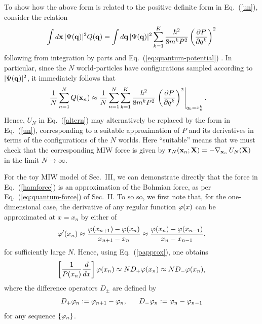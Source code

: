 \documentclass[twocolumn,aps,pra,amsmath,amssymb,superscriptaddress]{revtex4}
\renewcommand{\(}{\left(}
\renewcommand{\)}{\right)}
\newcommand{\blk}{\color{black}}
\begin{document}
{To show how the above form is related to the positive definite form in Eq.~(\ref{un}), consider the relation
\[ \int d{\bf x} \,|\Psi({\bf q})|^2 Q({\bf q}) = \int d{\bf q}\, |\Psi({\bf q})|^2 \sum_{k=1}^K\frac{\hbar^2}{8m^kP^2}\left(\frac{\partial P}{\partial q^k}\right)^2 \]
following from integration by parts and Eq.~(\ref{eq:quantum-potential}) \cite{dbb}.
In particular, since the $N$ world-particles have configurations sampled according to $|\Psi({\bf q})|^2$, it immediately follows that
\begin{align*} 
\frac{1}{N} \sum_{n=1}^N Q({\bf x}_n) &\approx \frac{1}{N} \sum_{n=1}^N \sum_{k=1}^K\frac{\hbar^2}{8m^kP^2}\left.\left(\frac{\partial P}{\partial q^k}\right)^2\right|_{\blk q_k = x_n^k}.
\end{align*}
Hence, $U_N$ in Eq.~(\ref{altern}) may alternatively be replaced by 
the form in  Eq.~(\ref{un}), corresponding to a suitable approximation of $P$ and its derivatives in terms of the configurations of the $N$ worlds.  \blk Here ``suitable'' means that we must check that the \blk corresponding MIW force is given by ${\bf r}_N({\bf x}_n; {\bf X})=-\nabla_{{\bf x}_n}\, U_N({\bf X})$ \blk in the limit $N\to\infty$. \blk 

For the \blk toy MIW model \blk of Sec.~III,  we can \blk demonstrate  directly that the force in  Eq.~(\ref{hamforce}) is an approximation of the Bohmian force, as per Eq.~(\ref{eq:quantum-force}) of Sec.~II. To so so, we first note that, for the one-dimensional case, the derivative of any regular function ${\blk \varphi}(x)$ can be approximated at $x=x_n$ by either of
\[{\blk \varphi}'(x_n)\approx \frac{{\blk \varphi}(x_{n+1})-{\blk \varphi}(x_n)}{x_{n+1} - x_{n}}\approx \frac{{\blk \varphi}(x_{n})-{\blk \varphi}(x_{n-1})}{x_{n} - x_{n-1}} ,\]
for sufficiently large $N$.
Hence, using Eq.~(\ref{papprox}), one obtains
\begin{equation} \label{fderiv}
\left[\frac{1}{P(x_n)}\frac{d}{dx} \right]{\blk \varphi}(x_n) \approx ND_+ {\blk \varphi}(x_n) \approx N D_- {\blk \varphi}(x_n),
\end{equation}
where the difference operators $D_\pm$ are defined by 
\[D_+{\blk \varphi}_n:={\blk \varphi}_{n+1}-{\blk \varphi}_n,~~~~~D_-{\blk \varphi}_n:= {\blk \varphi}_n-{\blk \varphi}_{n-1}\]
for any sequence $\{{\blk \varphi}_n\}$.  

}
\end{document}
